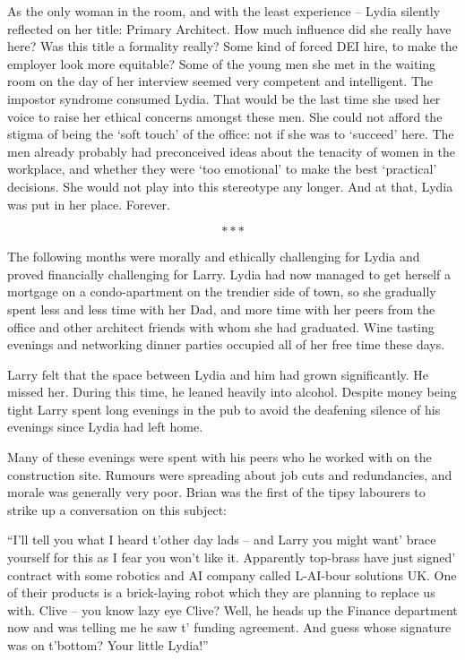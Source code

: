 As the only woman in the room, and with the least experience – Lydia
silently reflected on her title: Primary Architect. How much influence
did she really have here? Was this title a formality really?  Some
kind of forced DEI hire, to make the employer look more equitable?
Some of the young men she met in the waiting room on the day of her
interview seemed very competent and intelligent. The impostor syndrome
consumed Lydia. That would be the last time she used her voice to
raise her ethical concerns amongst these men. She could not afford the
stigma of being the ‘soft touch’ of the office: not if she was to
‘succeed’ here. The men already probably had preconceived ideas about
the tenacity of women in the workplace, and whether they were ‘too
emotional’ to make the best ‘practical’ decisions. She would not play
into this stereotype any longer. And at that, Lydia was put in her
place. Forever.

\[***\]

The following months were morally and ethically challenging for Lydia
and proved financially challenging for Larry. Lydia had now managed to
get herself a mortgage on a condo-apartment on the trendier side of
town, so she gradually spent less and less time with her Dad, and more
time with her peers from the office and other architect friends with
whom she had graduated. Wine tasting evenings and networking dinner
parties occupied all of her free time these days.

Larry felt that the space between Lydia and him had grown
significantly. He missed her. During this time, he leaned heavily into
alcohol. Despite money being tight Larry spent long evenings in the
pub to avoid the deafening silence of his evenings since Lydia had
left home.

Many of these evenings were spent with his peers who he worked with on
the construction site. Rumours were spreading about job cuts and
redundancies, and morale was generally very poor. Brian was the first
of the tipsy labourers to strike up a conversation on this subject:

“I’ll tell you what I heard t’other day lads – and Larry you might
want’ brace yourself for this as I fear you won’t like it. Apparently
top-brass have just signed’ contract with some robotics and AI company
called L-AI-bour solutions UK. One of their products is a brick-laying
robot which they are planning to replace us with. Clive – you know
lazy eye Clive? Well, he heads up the Finance department now and was
telling me he saw t’ funding agreement. And guess whose signature was
on t’bottom? Your little Lydia!”


